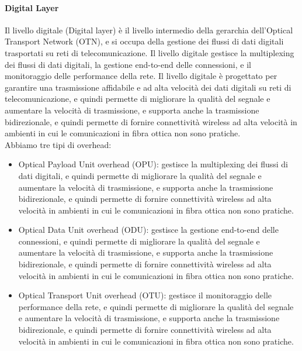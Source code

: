 \paragraph{Digital Layer}
Il livello digitale (Digital layer) è il livello intermedio della gerarchia dell'Optical Transport Network (OTN), e si occupa della gestione dei flussi di dati digitali trasportati su reti di telecomunicazione. Il livello digitale gestisce la multiplexing dei flussi di dati digitali, la gestione end-to-end delle connessioni, e il monitoraggio delle performance della rete. Il livello digitale è progettato per garantire una trasmissione affidabile e ad alta velocità dei dati digitali su reti di telecomunicazione, e quindi permette di migliorare la qualità del segnale e aumentare la velocità di trasmissione, e supporta anche la trasmissione bidirezionale, e quindi permette di fornire connettività wireless ad alta velocità in ambienti in cui le comunicazioni in fibra ottica non sono pratiche.\\

Abbiamo tre tipi di overhead:
\begin{itemize}
    \item Optical Payload Unit overhead (OPU): gestisce la multiplexing dei flussi di dati digitali, e quindi permette di migliorare la qualità del segnale e aumentare la velocità di trasmissione, e supporta anche la trasmissione bidirezionale, e quindi permette di fornire connettività wireless ad alta velocità in ambienti in cui le comunicazioni in fibra ottica non sono pratiche.\\
    \item Optical Data Unit overhead (ODU): gestisce la gestione end-to-end delle connessioni, e quindi permette di migliorare la qualità del segnale e aumentare la velocità di trasmissione, e supporta anche la trasmissione bidirezionale, e quindi permette di fornire connettività wireless ad alta velocità in ambienti in cui le comunicazioni in fibra ottica non sono pratiche.\\
    \item Optical Transport Unit overhead (OTU): gestisce il monitoraggio delle performance della rete, e quindi permette di migliorare la qualità del segnale e aumentare la velocità di trasmissione, e supporta anche la trasmissione bidirezionale, e quindi permette di fornire connettività wireless ad alta velocità in ambienti in cui le comunicazioni in fibra ottica non sono pratiche.\\
\end{itemize}

